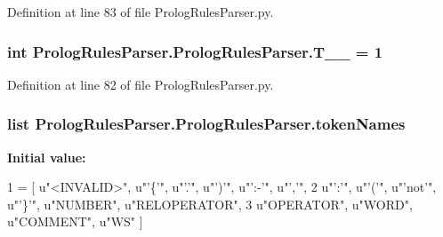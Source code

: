 Definition at line 83 of file Prolog\+Rules\+Parser.\+py.

\hypertarget{class_prolog_rules_parser_1_1_prolog_rules_parser_a4cb5c955b91ccf5dc36ad6db7202dcce}{}
\subsubsection[{T\+\_\+\+\_\+8}]{\setlength{\rightskip}{0pt plus 5cm}int Prolog\+Rules\+Parser.\+Prolog\+Rules\+Parser.\+T\+\_\+\+\_ = 1\hspace{0.3cm}{\ttfamily [static]}}\label{class_prolog_rules_parser_1_1_prolog_rules_parser_a4cb5c955b91ccf5dc36ad6db7202dcce}


Definition at line 82 of file Prolog\+Rules\+Parser.\+py.

\hypertarget{class_prolog_rules_parser_1_1_prolog_rules_parser_a5d992aa2b8f6419f374e365bf76d38d5}{}
\subsubsection[{token\+Names}]{\setlength{\rightskip}{0pt plus 5cm}list Prolog\+Rules\+Parser.\+Prolog\+Rules\+Parser.\+token\+Names\hspace{0.3cm}{\ttfamily [static]}}\label{class_prolog_rules_parser_1_1_prolog_rules_parser_a5d992aa2b8f6419f374e365bf76d38d5}
{\bfseries Initial value\+:}
\begin{DoxyCode}
1 = [ \textcolor{stringliteral}{u"<INVALID>"}, \textcolor{stringliteral}{u"'\{'"}, \textcolor{stringliteral}{u"'.'"}, \textcolor{stringliteral}{u"')'"}, \textcolor{stringliteral}{u"':-'"}, \textcolor{stringliteral}{u"','"}, 
2                    \textcolor{stringliteral}{u"':'"}, \textcolor{stringliteral}{u"'('"}, \textcolor{stringliteral}{u"'not'"}, \textcolor{stringliteral}{u"'\}'"}, \textcolor{stringliteral}{u"NUMBER"}, \textcolor{stringliteral}{u"RELOPERATOR"}, 
3                    \textcolor{stringliteral}{u"OPERATOR"}, \textcolor{stringliteral}{u"WORD"}, \textcolor{stringliteral}{u"COMMENT"}, \textcolor{stringliteral}{u"WS"} ]
\end{DoxyCode}


